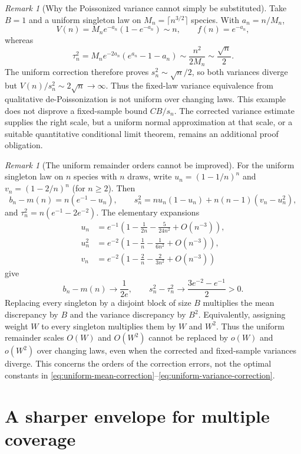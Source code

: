 \documentclass[11pt]{article}
\numberwithin{equation}{section}
\theoremstyle{remark}
\newtheorem{remark}[theorem]{Remark}
\begin{document}
\begin{remark}[Why the Poissonized variance cannot simply be substituted]
\label{rem:uniform-variance-cancellation}
Take $B=1$ and a uniform singleton law on
$M_n=\lceil n^{3/2}\rceil$ species. With $a_n=n/M_n$,
\[
 V(n)=M_n e^{-a_n}(1-e^{-a_n})\sim n,
 \qquad f(n)=e^{-a_n},
\]
whereas
\[
 \tau_n^2
 =M_n e^{-2a_n}(e^{a_n}-1-a_n)
 \sim\frac{n^2}{2M_n}\sim\frac{\sqrt n}{2}.
\]
The uniform correction therefore proves
$s_n^2\sim\sqrt n/2$, so both variances diverge but
$V(n)/s_n^2\sim2\sqrt n\to\infty$. Thus the fixed-law variance
equivalence from qualitative de-Poissonization is not uniform over changing
laws. This example does not disprove a fixed-sample bound $CB/s_n$.
The corrected variance estimate supplies the right scale, but a uniform
normal approximation at that scale, or a suitable quantitative conditional
limit theorem, remains an additional proof obligation.
\end{remark}

\begin{remark}[The uniform remainder orders cannot be improved]
\label{rem:uniform-correction-order}
For the uniform singleton law on $n$ species with $n$ draws, write
$u_n=(1-1/n)^n$ and $v_n=(1-2/n)^n$ (for $n\ge2$). Then
\[
 b_n-m(n)=n(e^{-1}-u_n),
 \qquad
 s_n^2=nu_n(1-u_n)+n(n-1)(v_n-u_n^2),
\]
and $\tau_n^2=n(e^{-1}-2e^{-2})$. The elementary expansions
\begin{align*}
 u_n&=e^{-1}\left(1-\frac1{2n}-\frac5{24n^2}+O(n^{-3})\right),\\
 u_n^2&=e^{-2}\left(1-\frac1n-\frac1{6n^2}+O(n^{-3})\right),\\
 v_n&=e^{-2}\left(1-\frac2n-\frac2{3n^2}+O(n^{-3})\right)
\end{align*}
give
\[
 b_n-m(n)\longrightarrow\frac1{2e},\qquad
 s_n^2-\tau_n^2\longrightarrow
       \frac{3e^{-2}-e^{-1}}2>0.
\]
Replacing every singleton by a disjoint block of size $B$ multiplies the
mean discrepancy by $B$ and the variance discrepancy by $B^2$. Equivalently,
assigning weight $W$ to every singleton multiplies them by $W$ and $W^2$.
Thus the uniform remainder scales $O(W)$ and $O(W^2)$ cannot be replaced
by $o(W)$ and $o(W^2)$ over changing laws, even when the corrected and
fixed-sample variances diverge. This concerns the orders of the correction
errors, not the optimal constants in
\eqref{eq:uniform-mean-correction}--\eqref{eq:uniform-variance-correction}.
\end{remark}

\section{A sharper envelope for multiple coverage}
\label{sec:sharper-threshold}
\end{document}
